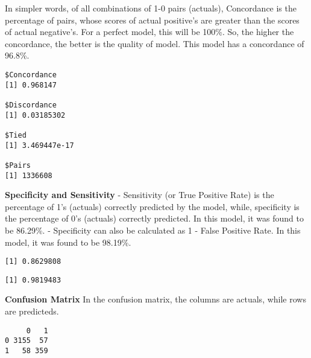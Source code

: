 \documentclass[12pt,twoside]{reedthesis}
\newenvironment{Shaded}{\begin{snugshade}}{\end{snugshade}}
\newcommand{\KeywordTok}[1]{\textcolor[rgb]{0.13,0.29,0.53}{\textbf{{#1}}}}
\newcommand{\DataTypeTok}[1]{\textcolor[rgb]{0.13,0.29,0.53}{{#1}}}
\newcommand{\NormalTok}[1]{{#1}}
\theoremstyle{definition}
\theoremstyle{definition}
\theoremstyle{definition}
\theoremstyle{remark}
\begin{document}
In simpler words, of all combinations of 1-0 pairs (actuals),
Concordance is the percentage of pairs, whose scores of actual
positive's are greater than the scores of actual negative's. For a
perfect model, this will be 100\%. So, the higher the concordance, the
better is the quality of model. This model has a concordance of 96.8\%.
\begin{Shaded}
\end{Shaded}
\begin{verbatim}
$Concordance
[1] 0.968147

$Discordance
[1] 0.03185302

$Tied
[1] 3.469447e-17

$Pairs
[1] 1336608
\end{verbatim}
\hfill\break
\textbf{Specificity and Sensitivity} \hfill\break
- Sensitivity (or True Positive Rate) is the percentage of 1's (actuals)
correctly predicted by the model, while, specificity is the percentage
of 0's (actuals) correctly predicted. In this model, it was found to be
86.29\%. \hfill\break
- Specificity can also be calculated as 1 - False Positive Rate. In this
model, it was found to be 98.19\%.
\begin{Shaded}
\end{Shaded}
\begin{verbatim}
[1] 0.8629808
\end{verbatim}
\begin{Shaded}
\end{Shaded}
\begin{verbatim}
[1] 0.9819483
\end{verbatim}
\hfill\break
\textbf{Confusion Matrix} \hfill\break
In the confusion matrix, the columns are actuals, while rows are
predicteds.
\begin{Shaded}
\end{Shaded}
\begin{verbatim}
     0   1
0 3155  57
1   58 359
\end{verbatim}
\end{document}
